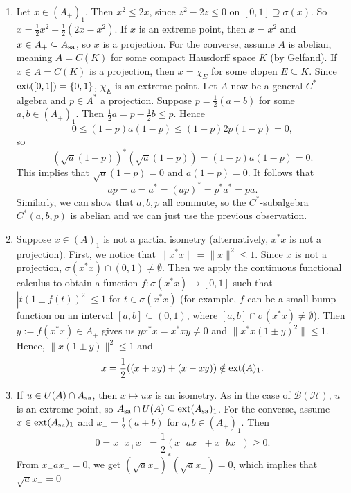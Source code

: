 \begin{myproof}
  \begin{enumerate}
    \item Let $x \in (A_+)_1$. Then $x^2 \leq 2x$, since $z^2 - 2z \leq 0$ on $[0, 1] \supseteq \sigma(x)$.
    So $x = \frac{1}{2} x^2 + \frac{1}{2} (2x - x^2)$.
    If $x$ is an extreme point, then $x = x^2$ and $x \in A_+ \subseteq A_{\operatorname{sa}}$, so $x$ is a projection.
    For the converse, assume $A$ is abelian, meaning $A = C(K)$
    for some compact Hausdorff space $K$ (by Gelfand). If $x \in A = C(K)$ is a projection, then $x = \chi_{E}$
    for some clopen $E \subseteq K$. Since $\operatorname{ext} ([0, 1]) = \{0, 1\}$, $\chi_E$ is an extreme point.
    Let $A$ now be a general $C^*$-algebra and $p \in A^*$ a projection. Suppose $p = \frac{1}{2} (a + b)$
    for some $a, b \in (A_+)_1$. Then $\frac{1}{2} a = p - \frac{1}{2} b \leq p$.
    Hence 
    $$0 \leq (1 - p)a(1 - p) \leq (1 - p) 2p (1 - p) = 0,$$
    so $$(\sqrt{a} (1 - p))^* (\sqrt{a} (1 - p)) = (1 - p)a(1 - p) = 0.$$
    This implies that $\sqrt{a} (1 - p) = 0$ and $a (1 - p) = 0$.
    It follows that
    $$ap = a = a^* = (ap)^* = p^* a^* = pa.$$
    Similarly, we can show that $a, b, p$ all commute, so the $C^*$-subalgebra $C^*(a, b, p)$ is abelian and we can just use the previous observation.
    \item Suppose $x \in (A)_1$ is not a partial isometry (alternatively, $x^* x$ is not a projection).
    First, we notice that $\| x^* x\| = \|x\|^2 \leq 1$. Since $x$ is not a projection, $\sigma(x^* x) \cap (0, 1) \neq \emptyset$.
    Then we apply the continuous functional calculus to obtain a function $f: \sigma(x^* x) \to [0, 1]$ such that 
    $|t (1 \pm f(t))^2| \leq 1$ for $t \in \sigma(x^* x)$ (for example, $f$ can be a small bump function on an interval $[a, b] \subseteq (0, 1)$, where $[a, b] \cap \sigma(x^* x) \neq \emptyset$).
    Then $y := f(x^* x) \in A_+$ gives us $yx^* x = x^* x y \neq 0$
    and $\|x^* x (1 \pm y)^2\| \leq 1$. Hence, $\|x (1 \pm y)\|^2 \leq 1$ and 
    $$x = \frac{1}{2} ((x + xy) + (x - xy)) \notin \operatorname{ext}(A)_1.$$
    \item If $u \in U(A) \cap A_{\operatorname{sa}}$, then $x \mapsto ux$ is an isometry. As in the case of $\mathcal{B}(\mathcal{H})$,
    $u$ is an extreme point, so $A_{\operatorname{sa}} \cap U(A) \subseteq \operatorname{ext} (A_{\operatorname{sa}})_1$. For the converse, assume 
    $x \in \operatorname{ext} (A_{\operatorname{sa}})_1$ and $x_+ = \frac{1}{2} (a + b)$ for $a, b \in (A_+)_{1}$. Then 
    $$0 = x_- x_+ x_- = \frac{1}{2} (x_- a x_- + x_- b x_-) \geq 0.$$
    From $x_- a x_- = 0$, we get $(\sqrt{a} x_-)^* (\sqrt{a} x_-) = 0$, which implies that $\sqrt{a} x_- = 0$

\end{enumerate}
\end{myproof}
